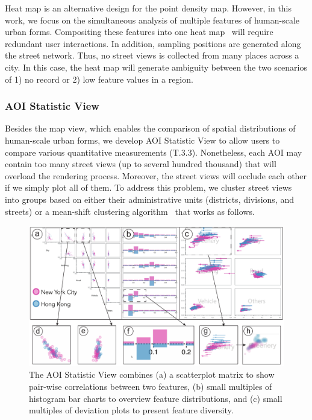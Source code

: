 Heat map is an alternative design for the point density map.
However, in this work, we focus on the simultaneous analysis of multiple features of human-scale urban forms.
Compositing these features into one heat map~\cite{scheepens_2011_composite} will require redundant user interactions.
In addition, sampling positions are generated along the street network.
Thus, no street views is collected from many places across a city.
In this case, the heat map will generate ambiguity between the two scenarios of 1) no record or 2) low feature values in a region.



\subsubsection{AOI Statistic View}
\label{sssec:c1_statistic_view}

Besides the map view, which enables the comparison of spatial distributions of human-scale urban forms, we develop AOI Statistic View to allow users to compare various quantitative measurements (T.3.3).
Nonetheless, each AOI may contain too many street views (up to several hundred thousand) that will overload the rendering process.
Moreover, the street views will occlude each other if we simply plot all of them.
To address this problem, we cluster street views into groups based on either their administrative units (districts, divisions, and streets) or a mean-shift clustering algorithm~\cite{comaniciu_2002_meanshift} that works as follows.

\begin{figure}[t]
	\centering
	\includegraphics[width=0.9\columnwidth]{figure/streetvizor/fig5_statistic_view/statistic_view}
	\vspace{-4mm}
	\caption{The AOI Statistic View combines (a) a scatterplot matrix to show pair-wise correlations between two features, (b) small multiples of histogram bar charts to overview feature distributions, and (c) small multiples of deviation plots to present feature diversity. }
	\label{fig:c1_statistic_view}
	\vspace{-1mm}
\end{figure}

